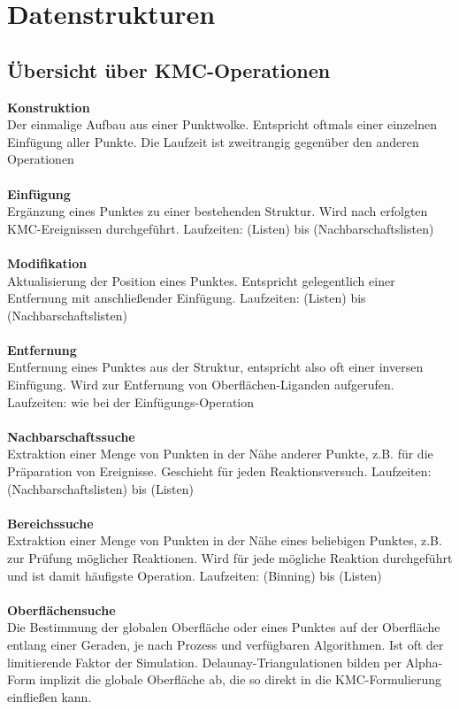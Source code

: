 \chapter{Datenstrukturen}
\label{appendix_datastructures}

\section{Übersicht über KMC-Operationen}
\label{dataops}


\textbf{Konstruktion} \\
Der einmalige Aufbau aus einer Punktwolke.
Entspricht oftmals einer einzelnen Einfügung aller Punkte.
Die Laufzeit ist zweitrangig gegenüber den anderen Operationen
\\\\
\textbf{Einfügung} \\
Ergänzung eines Punktes zu einer bestehenden Struktur.
Wird nach erfolgten KMC-Ereignissen durchgeführt.
Laufzeiten:  (Listen) bis  (Nachbarschaftslisten)
\\\\
\textbf{Modifikation} \\
Aktualisierung der Position eines Punktes.
Entspricht gelegentlich einer Entfernung mit anschließender Einfügung.
Laufzeiten:  (Listen) bis  (Nachbarschaftslisten)
\\\\
\textbf{Entfernung} \\
Entfernung eines Punktes aus der Struktur, entspricht also oft einer inversen Einfügung.
Wird zur Entfernung von Oberflächen-Liganden aufgerufen.
Laufzeiten: wie bei der Einfügungs-Operation
\\\\
\textbf{Nachbarschaftssuche} \\
Extraktion einer Menge von Punkten in der Nähe anderer Punkte, z.B. für die Präparation von Ereignisse.
Geschieht für jeden Reaktionsversuch.
Laufzeiten:  (Nachbarschaftslisten) bis  (Listen)
\\\\
\textbf{Bereichssuche} \\
Extraktion einer Menge von Punkten in der Nähe eines beliebigen Punktes, z.B. zur Prüfung möglicher Reaktionen.
Wird für jede mögliche Reaktion durchgeführt und ist damit häufigste Operation.
Laufzeiten:  (Binning) bis  (Listen)
\\\\
\textbf{Oberflächensuche} \\
Die Bestimmung der globalen Oberfläche oder eines Punktes auf der Oberfläche entlang einer Geraden, je nach Prozess und verfügbaren Algorithmen.
Ist oft der limitierende Faktor der Simulation.
Delaunay-Triangulationen bilden per Alpha-Form implizit die globale Oberfläche ab, die so direkt in die KMC-Formulierung einfließen kann.


